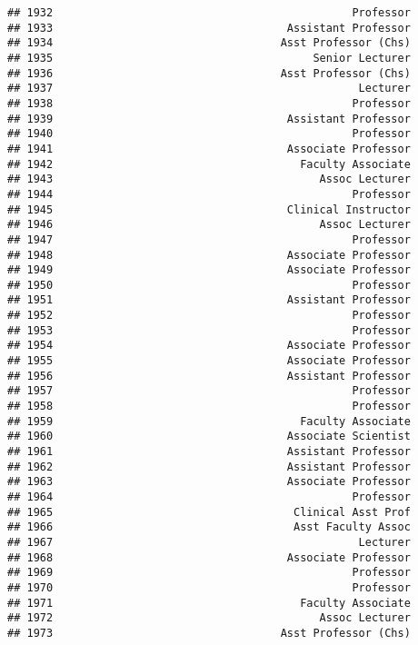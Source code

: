 \documentclass[
]{article}
\begin{document}
\begin{verbatim}
## 1932                                              Professor
## 1933                                    Assistant Professor
## 1934                                   Asst Professor (Chs)
## 1935                                        Senior Lecturer
## 1936                                   Asst Professor (Chs)
## 1937                                               Lecturer
## 1938                                              Professor
## 1939                                    Assistant Professor
## 1940                                              Professor
## 1941                                    Associate Professor
## 1942                                      Faculty Associate
## 1943                                         Assoc Lecturer
## 1944                                              Professor
## 1945                                    Clinical Instructor
## 1946                                         Assoc Lecturer
## 1947                                              Professor
## 1948                                    Associate Professor
## 1949                                    Associate Professor
## 1950                                              Professor
## 1951                                    Assistant Professor
## 1952                                              Professor
## 1953                                              Professor
## 1954                                    Associate Professor
## 1955                                    Associate Professor
## 1956                                    Assistant Professor
## 1957                                              Professor
## 1958                                              Professor
## 1959                                      Faculty Associate
## 1960                                    Associate Scientist
## 1961                                    Assistant Professor
## 1962                                    Assistant Professor
## 1963                                    Associate Professor
## 1964                                              Professor
## 1965                                     Clinical Asst Prof
## 1966                                     Asst Faculty Assoc
## 1967                                               Lecturer
## 1968                                    Associate Professor
## 1969                                              Professor
## 1970                                              Professor
## 1971                                      Faculty Associate
## 1972                                         Assoc Lecturer
## 1973                                   Asst Professor (Chs)

\end{verbatim}
\end{document}
